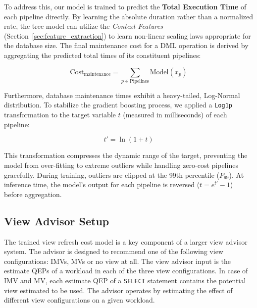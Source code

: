 To address this, our model is trained to predict the \textbf{Total Execution Time} of each pipeline directly. By learning the absolute duration rather than a normalized rate, the tree model can utilize the \textit{Context Features} (Section~\ref{sec:feature_extraction}) to learn non-linear scaling laws appropriate for the database size. The final maintenance cost for a \ac{DML} operation is derived by aggregating the predicted total times of its constituent pipelines:

\[
\text{Cost}_{\text{maintenance}} = \sum_{p \in \text{Pipelines}} \text{Model}(x_p)
\]

Furthermore, database maintenance times exhibit a heavy-tailed, Log-Normal distribution. To stabilize the gradient boosting process, we applied a \texttt{Log1p} transformation to the target variable $t$ (measured in milliseconds) of each pipeline:

\[
t' = \ln(1 + t)
\]

This transformation compresses the dynamic range of the target, preventing the model from over-fitting to extreme outliers while handling zero-cost pipelines gracefully. During training, outliers are clipped at the 99th percentile ($P_{99}$). At inference time, the model's output for each pipeline is reversed ($t = e^{t'} - 1$) before aggregation.

\subsection{View Advisor Setup}
\label{sec:view_advisor_setup}

The trained view refresh cost model is a key component of a larger view advisor system. The advisor is designed to recommend one of the following view configurations: \acp{IMV}, \acp{MV} or no view at all. The view advisor input is the estimate \ac{QEP}s of a workload in each of the three view configurations. In case of \ac{IMV} and \ac{MV}, each estimate \ac{QEP} of a \texttt{SELECT} statement contains the potential view estimated to be used. The advisor operates by estimating the effect of different view configurations on a given workload.

